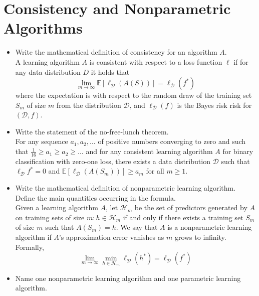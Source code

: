 \newpage
\section{Consistency and Nonparametric Algorithms}

\begin{itemize}

    \item Write the mathematical definition of consistency for an algorithm $A$.\\ 
        
        A learning algorithm $A$ is consistent with respect to a loss function $\ell$ if for any data
distribution $D$ it holds that
        $$
        \lim_{m \to \infty} \mathbb{E} \left[ \ell_{\mathcal{D}}(A(S)) \right] = \ell_{\mathcal{D}}(f^*)
        $$
        where the expectation is with respect to the random draw of the training set $S_m$ of size $m$ from the distribution $\mathcal{D}$, and $\ell_{\mathcal{D}}(f)$ is the Bayes risk risk for $(\mathcal{D}, f)$.\\

    \item Write the statement of the no-free-lunch theorem.\\
        
        For any sequence $a_1, a_2, \dots$ of positive numbers converging to zero and such that $\frac{1}{16} \geq a_1 \geq a_2 \geq \dots$ and for any consistent learning algorithm $A$ for binary classification with zero-one loss, there exists a data distribution $\mathcal{D}$ such that $\ell_{\mathcal{D}}f^* = 0$ and $\mathbb{E}[\ell_{\mathcal{D}}(A(S_m))] \geq a_m$ for all $m \geq 1$.\\

    \item Write the mathematical definition of nonparametric learning algorithm. Define the main quantities occurring in the formula.\\

        Given a learning algorithm $A$, let $\mathcal{H}_m$ be the set of predictors generated by $A$ on training sets of size $m: h \in \mathcal{H}_m$ if and only if there exists a training set $S_m$ of size $m$ such that $A(S_m) = h$. We say that $A$ is a nonparametric learning algorithm if $A$'s approximation error vanishes as $m$ grows to infinity. Formally,
        $$
        \lim_{m \to \infty} \min_{h \in \mathcal{H}_m} \ell_{\mathcal{D}}(h^*) = \ell_{\mathcal{D}}(f^*) 
        $$

    \item Name one nonparametric learning algorithm and one parametric learning algorithm.\\


\end{itemize}
